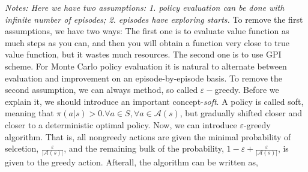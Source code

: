 \documentclass[11pt,a4paper]{article}
\def\A{{\mathcal A}}
\begin{document}
\emph{Notes: Here we have two assumptions: 1. policy evaluation can be done with infinite number of episodes; 2. episodes have exploring starts.} To remove the first assumptions, we have two ways: The first one is to evaluate value function as much steps as you can, and then you will obtain a function very close to true value function, but it wastes much resources. The second one is to use GPI scheme. For Monte Carlo policy evaluation it is natural to alternate between evaluation and improvement on an episode-by-episode basis. To remove the second assumption, we can always method, so called $\varepsilon-$greedy. Before we explain it, we should introduce an important concept-\emph{soft}. A policy is called soft, meaning that $\pi(a|s) > 0. \forall a\in S, \forall a\in \A(s)$, but gradually shifted closer and closer to a deterministic optimal policy. Now, we can introduce $\varepsilon$-greedy algorithm. That is, all nongreedy actions are given the minimal probability of selcetion, $\frac{\varepsilon}{|\A(s)|}$, and the remaining bulk of the probability, $1 - \varepsilon + \frac{\varepsilon}{|\A(s)|}$, is given to the greedy action. Afterall, the algorithm can be written as,
\end{document}
